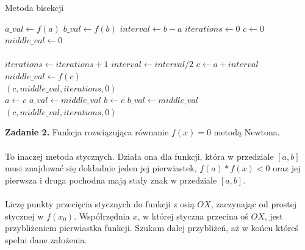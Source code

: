 \documentclass[15pt, a4paper]{article}
\begin{document}
\pagebreak

\begin{algorithm}
\caption{Metoda bisekcji}
\label{alg:metoda_bisekcji}
\begin{algorithmic}[1]
    \State $a\_val \gets f(a)$
    \State $b\_val \gets f(b)$
    \State $interval \gets b - a$
    \State $iterations \gets 0$
    \State $c \gets 0$
    \State $middle\_val \gets 0$\\

        \State \Return {}
    \EndIf\\

        \State $iterations \gets iterations + 1$
        \State $interval \gets interval / 2$
        \State $c \gets a + interval$
        \State $middle\_val \gets f(c)$\\

            \State \Return $(c, middle\_val, iterations, 0)$
        \EndIf\\

            \State $a \gets c$
            \State $a\_val \gets middle\_val$
        \Else
            \State $b \gets c$
            \State $b\_val \gets middle\_val$
        \EndIf
    \EndWhile\\

    \State \Return $(c, middle\_val, iterations, 0)$\\
\EndFunction
\end{algorithmic}
\end{algorithm}



\vspace{0.5cm}

\noindent\hrulefill

\vspace{0.5cm}


\noindent\textbf{Zadanie 2.} Funkcja rozwiązująca równanie \( f(x) = 0 \) metodą Newtona.\\\\
\noindent To inaczej metoda stycznych. Działa ona dla funkcji, która w przedziale \([a, b]\) musi znajdować się dokładnie jeden jej pierwiastek,  \(f(a) * f(x) < 0 \) oraz jej pierwsza i druga pochodna mają stały znak w przedziale \( [a, b] \).\\\\
\noindent Liczę punkty przecięcia stycznych do funkcji z osią \( OX \), zaczynając od prostej stycznej w \( f(x_0) \). Współrzędnia \(x\), w której styczna przecina oś \(OX\), jest przybliżeniem pierwiastka funkcji. Szukam dalej przybliżeń, aż w końcu któreś spełni dane założenia. 
\end{document}
